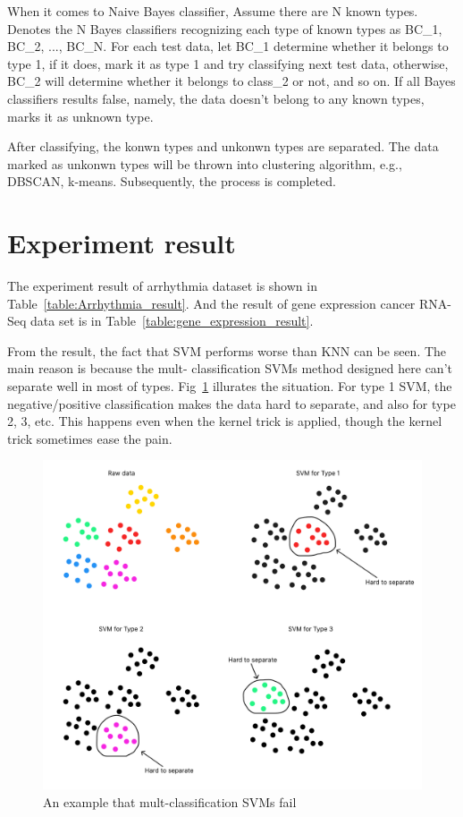 \documentclass[twocolumn,10pt]{article}
\begin{document}
  When it comes to Naive Bayes classifier, Assume there are N known types. Denotes the N Bayes classifiers recognizing each
  type of known types as BC_1, BC_2, ..., BC_N. For each test data, let BC_1 determine whether it belongs to     type 1, if
  it does, mark it as type 1 and try classifying next test data, otherwise, BC_2 will determine whether it belongs to class_2
  or not, and so on. If all Bayes classifiers results false, namely, the data doesn't belong to     any known types, marks it
  as unknown type.
  
  After classifying, the konwn types and unkonwn types are separated. The data marked as unkonwn types will be thrown 
  into clustering algorithm, e.g., DBSCAN, k-means. Subsequently, the process is completed.

\section{Experiment result}
  The experiment result of arrhythmia dataset is shown in Table~\ref{table:Arrhythmia_result}. And the result of gene 
  expression cancer RNA-Seq data set is in Table~\ref{table:gene_expression_result}. 

  From the result, the fact that SVM performs worse than KNN can be seen. The main reason is because the mult- 
  classification SVMs method designed here can't separate well in most of types. Fig~\ref{fig:SVM_fail} illurates the 
  situation. For type 1 SVM, the negative/positive classification makes the data hard to separate, and also for type 
  2, 3, etc. This happens even when the kernel trick is applied, though the kernel trick sometimes ease the pain. 
  \begin{figure}[htb]
    \centering
    \includegraphics[scale=0.15]{assets/SVM_fail.pdf}
    \caption{An example that mult-classification SVMs fail}
    \label{fig:SVM_fail}
  \end{figure}
\end{document}
